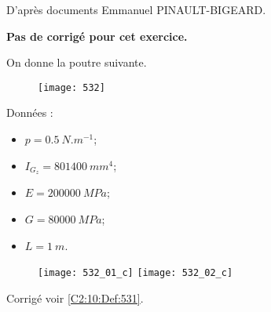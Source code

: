 \normaltrue
\correctionfalse


\setcounter{numques}{0}

\begin{flushright}
\footnotesize{D'après documents Emmanuel PINAULT-BIGEARD.}
\end{flushright}


\ifcorrection
\else
\textbf{Pas de corrigé pour cet exercice.}
\fi

On donne la poutre suivante. 

\begin{figure}[H]
\centering
\texttt{[image: 532]}
\end{figure}

Données : 
\begin{itemize}
\item $p=\SI{0,5}{N.m^{-1}}$;
\item $I_{G_z} = \SI{801400}{mm^4}$;
\item $E = \SI{200000}{MPa}$;
\item $G = \SI{80000}{MPa}$;
\item $L= \SI{1}{m}$.
\end{itemize}

\ifprof
\else
\fi

\ifprof
\else
\fi

\ifprof
\else
\fi



\ifprof
\begin{figure}[H]
\centering
\texttt{[image: 532\_01\_c]}
\texttt{[image: 532\_02\_c]}
\end{figure}
\else

\begin{flushright}
\footnotesize{Corrigé  voir \ref{C2:10:Def:531}.}
\end{flushright}%
\fi